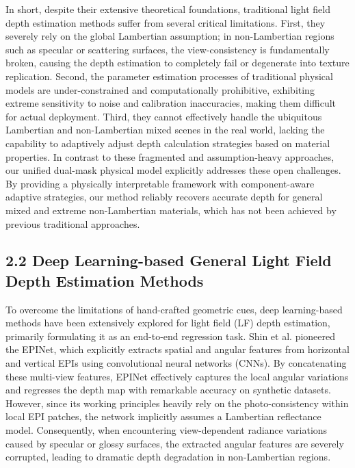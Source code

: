 \documentclass[journal]{IEEEtran}
\begin{document}
In short, despite their extensive theoretical foundations, traditional light field depth estimation methods suffer from several critical limitations. First, they severely rely on the global Lambertian assumption; in non-Lambertian regions such as specular or scattering surfaces, the view-consistency is fundamentally broken, causing the depth estimation to completely fail or degenerate into texture replication. Second, the parameter estimation processes of traditional physical models are under-constrained and computationally prohibitive, exhibiting extreme sensitivity to noise and calibration inaccuracies, making them difficult for actual deployment. Third, they cannot effectively handle the ubiquitous Lambertian and non-Lambertian mixed scenes in the real world, lacking the capability to adaptively adjust depth calculation strategies based on material properties. In contrast to these fragmented and assumption-heavy approaches, our unified dual-mask physical model explicitly addresses these open challenges. By providing a physically interpretable framework with component-aware adaptive strategies, our method reliably recovers accurate depth for general mixed and extreme non-Lambertian materials, which has not been achieved by previous traditional approaches.

\subsection{2.2 Deep Learning-based General Light Field Depth Estimation Methods}

To overcome the limitations of hand-crafted geometric cues, deep learning-based methods have been extensively explored for light field (LF) depth estimation, primarily formulating it as an end-to-end regression task. Shin et al.  pioneered the EPINet, which explicitly extracts spatial and angular features from horizontal and vertical EPIs using convolutional neural networks (CNNs). By concatenating these multi-view features, EPINet effectively captures the local angular variations and regresses the depth map with remarkable accuracy on synthetic datasets. However, since its working principles heavily rely on the photo-consistency within local EPI patches, the network implicitly assumes a Lambertian reflectance model. Consequently, when encountering view-dependent radiance variations caused by specular or glossy surfaces, the extracted angular features are severely corrupted, leading to dramatic depth degradation in non-Lambertian regions.
\end{document}
